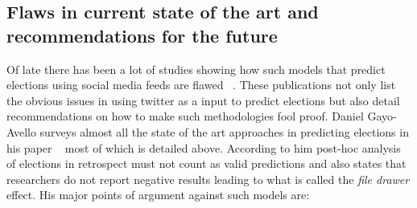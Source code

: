 \subsection{Flaws in current state of the art and recommendations for the future}
Of late there has been a lot of studies showing how such models that predict elections using social media feeds are flawed ~\cite{metaxas2011not,gayo2012wanted,gayo2011don,gayo2011limits}. These publications not only list the obvious issues in using twitter as a input to predict elections but also detail recommendations on how to make such methodologies fool proof. Daniel Gayo-Avello surveys almost all the state of the art approaches in predicting elections in his paper ~\cite{gayo2012wanted} most of which is detailed above. According to him post-hoc analysis of elections in retrospect must not count as valid predictions and also states that researchers do not report negative results leading to what is called the \emph{file drawer} effect. His major points of argument against such models are:
